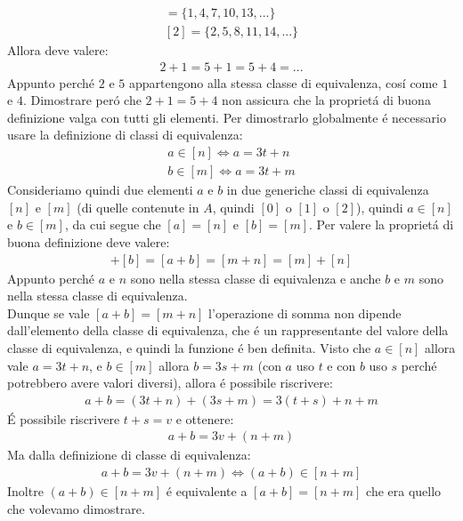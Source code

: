 \documentclass[twoside]{article} %
\begin{document}
	\begin{gather*}
		[1]=\{1,4,7,10,13,...\}\\
		[2]=\{2,5,8,11,14,...\}
	\end{gather*}
	Allora deve valere:
	\begin{gather*}
		2+1=5+1=5+4=...
	\end{gather*}
	Appunto perch\'e $2$ e $5$ appartengono alla stessa classe di equivalenza, cos\'i come $1$ e $4$. Dimostrare per\'o che $2+1=5+4$ non assicura che la propriet\'a di buona definizione valga con tutti gli elementi. Per dimostrarlo globalmente \'e necessario usare la definizione di classi di equivalenza:
	\begin{gather*}
		a\in [n]\Leftrightarrow a=3t+n\\
		b\in [m]\Leftrightarrow a=3t+m
	\end{gather*}
	Consideriamo quindi due elementi $a$ e $b$ in due generiche classi di equivalenza $[n]$ e $[m]$ (di quelle contenute in $A$, quindi $[0]$ o $[1]$ o $[2]$), quindi $a\in[n]$ e $b\in [m]$, da cui segue che $[a]=[n]$ e $[b]=[m]$. Per valere la propriet\'a di buona definizione deve valere:
	\begin{gather*}
		[a]+[b]=[a+b]=[m+n]=[m]+[n]
	\end{gather*}
	Appunto perch\'e $a$ e $n$ sono nella stessa classe di equivalenza e anche $b$ e $m$ sono nella stessa classe di equivalenza. \\Dunque se vale $[a+b]=[m+n]$ l'operazione di somma non dipende dall'elemento della classe di equivalenza, che \'e un rappresentante del valore della classe di equivalenza, e quindi la funzione \'e ben definita.
	\newpage
	\noindent Visto che $a\in [n]$ allora vale $a=3t+n$, e $b\in [m]$ allora $b=3s+m$ (con $a$ uso $t$ e con $b$ uso $s$ perch\'e potrebbero avere valori diversi), allora \'e possibile riscrivere:
	\begin{gather*}
		a+b=(3t+n)+(3s+m)=3(t+s)+n+m
	\end{gather*}
	\'E possibile riscrivere $t+s=v$ e ottenere:
	\begin{gather*}
		a+b=3v+(n+m)
	\end{gather*}
	Ma dalla definizione di classe di equivalenza:
	\begin{gather*}
		a+b=3v+(n+m)\Leftrightarrow (a+b)\in [n+m]
	\end{gather*}
	Inoltre $(a+b)\in [n+m]$ \'e equivalente a $[a+b]=[n+m]$ che era quello che volevamo dimostrare.\\
\end{document}
